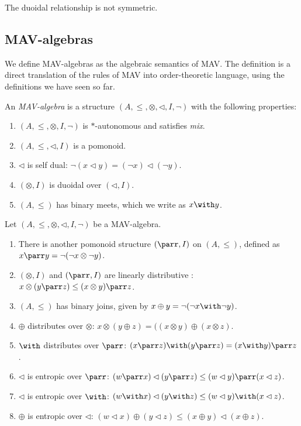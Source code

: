 \begin{remark}
  The duoidal relationship is not symmetric.
\end{remark}

\subsection{MAV-algebras}

We define MAV-algebras as the algebraic semantics of MAV. The
definition is a direct translation of the rules of MAV into
order-theoretic language, using the definitions we have seen so far.

\begin{definition}\label{defn:mav-algebra}
  An \emph{MAV-algebra} is a structure
  $(A, \leq, \otimes, \lhd, I, \lnot)$ with the following properties:
  \begin{enumerate}
  \item $(A, \leq, \otimes, I, \lnot)$ is $*$-autonomous and satisfies \emph{mix}.
  \item $(A, \leq, \lhd, I)$ is a pomonoid.
  \item $\lhd$ is self dual: $\lnot (x \lhd y) = (\lnot x)\lhd (\lnot y)$.
  \item $(\otimes, I)$ is duoidal over $(\lhd, I)$.
  \item $(A, \leq)$ has binary meets, which we write as $x \with y$.
  \end{enumerate}
\end{definition}

\begin{proposition}\label{prop:mav-algebra-consequences}
  Let $(A, \leq, \otimes, \lhd, I, \lnot)$ be a MAV-algebra.
  \begin{enumerate}
    \item There is another pomonoid structure $(\parr, I)$ on
          $(A, \leq)$, defined as
          $x \parr y = \lnot(\lnot x \otimes \lnot y)$.
    \item $(\otimes, I)$ and $(\parr, I)$ are linearly distributive
          \cite{cockett}:
          $x \otimes (y \parr z) \leq (x \otimes y) \parr z$.
    \item $(A, \leq)$ has binary joins, given by
          $x \oplus y = \lnot (\lnot x \with \lnot y)$.
    \item $\oplus$ distributes over $\otimes$:
          $x \otimes (y \oplus z) = ((x \otimes y) \oplus (x \otimes z)$.
    \item $\with$ distributes over $\parr$:
          $(x \parr z) \with (y \parr z) = (x \with y) \parr z$.
    \item $\lhd$ is entropic over $\parr$:
          $(w \parr x)\lhd (y \parr z) \leq (w\lhd y) \parr (x\lhd z)$.
    \item $\lhd$ is entropic over $\with$:
          $(w \with x)\lhd (y \with z) \leq (w \lhd y) \with (x\lhd z)$.
    \item $\oplus$ is entropic over $\lhd$:
          $(w \lhd x) \oplus (y \lhd z) \leq (x \oplus y) \lhd (x \oplus z)$.
  \end{enumerate}
\end{proposition}

